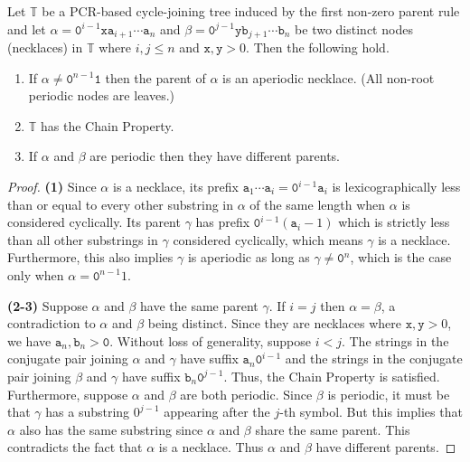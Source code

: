 \documentclass[US-letter,USenglish,authorcolumns,autoref]{lipics-v2021}
\renewcommand{\tt} {\mathtt}
\begin{document}
\begin{lemma} \label{lem:props}
Let $\mathbb{T}$ be a PCR-based cycle-joining tree induced by the  first non-zero parent rule and let $\alpha = \tt{0}^{i-1}\tt{x}\tt{a}_{i+1}\cdots \tt{a}_n$ and
$\beta = \tt{0}^{j-1}\tt{y}\tt{b}_{j+1}\cdots \tt{b}_n$ be two distinct nodes (necklaces) in $\mathbb{T}$ where $i,j \leq n$ and $\tt{x},\tt{y} > 0$.  Then the following hold. 
\begin{enumerate}

    \item If $\alpha \neq \tt{0}^{n-1}\tt{1}$ then the parent of $\alpha$ is an aperiodic necklace. (All non-root periodic nodes are leaves.)
        \item $\mathbb{T}$ has the Chain Property.
    \item If $\alpha$ and $\beta$ are periodic then they have different parents.
\end{enumerate}
\end{lemma}
%
\begin{proof}
{\bf (1)} Since $\alpha$ is a necklace, its prefix $\tt{a}_1\cdots \tt{a}_i = \tt{0}^{i-1}\tt{a}_i$ is lexicographically less than or equal to every other substring in $\alpha$ of the same length when $\alpha$ is considered cyclically. Its parent $\gamma$ has prefix $\tt{0}^{i-1}(\tt{a}_i-1)$
which is strictly less than all other substrings in $\gamma$ considered cyclically, which means $\gamma$ is a necklace. Furthermore, this also implies $\gamma$ is aperiodic as long as $\gamma \neq \tt{0}^n$, which is the case only when $\alpha = \tt{0}^{n-1}1$.

{\bf (2-3)}
Suppose $\alpha$ and $\beta$ have the same parent $\gamma$.  If $i=j$ then $\alpha = \beta$, a contradiction to $\alpha$ and $\beta$ being distinct. Since they are necklaces where $\tt{x},\tt{y} > 0$, we have $\tt{a}_n, \tt{b}_n > \tt{0}$. Without loss of generality, suppose $i < j$.  The strings in the conjugate pair joining $\alpha$ and $\gamma$ have suffix $\tt{a}_n\tt{0}^{i-1}$ and the strings in the conjugate pair joining $\beta$ and $\gamma$ have suffix $\tt{b}_n\tt{0}^{j-1}$.  Thus, the Chain Property is satisfied. Furthermore, suppose $\alpha$ and $\beta$ are both periodic. Since $\beta$ is periodic, it must be that $\gamma$ has a substring $0^{j-1}$ appearing after the $j$-th symbol.  But this implies that $\alpha$ also has the same substring since  $\alpha$ and $\beta$ share the same parent. This contradicts the fact that $\alpha$ is a necklace.
Thus $\alpha$ and $\beta$ have different parents.  
\end{proof}
\end{document}
